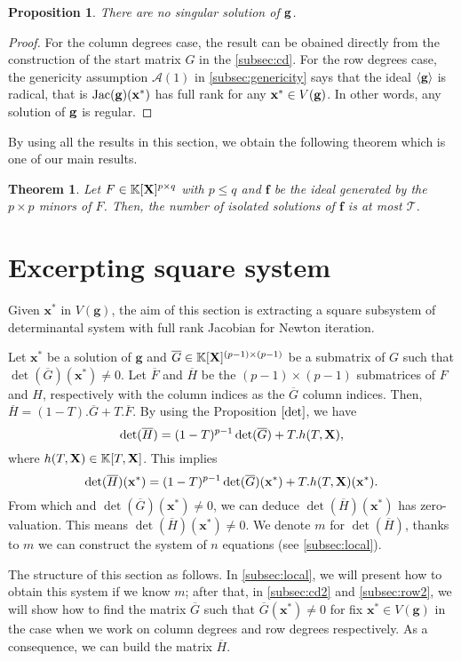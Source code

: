 \documentclass[11pt]{article}
\numberwithin{Property}{section}
\newtheorem{Theorem}{Theorem}%
\numberwithin{Theorem}{section}
\newtheorem{Proposition}{Proposition}%
\numberwithin{Proposition}{section}
\numberwithin{Lemma}{section}
\numberwithin{Corollary}{section}
\numberwithin{Definition}{section}
\numberwithin{Remark}{section}
\numberwithin{Conjecture}{section}
\numberwithin{Problem}{section}
\numberwithin{Claim}{section}
\theoremstyle{definition}
\numberwithin{Example}{section}
\def\f {\ensuremath{\mathbf{f}}}
\def\g {\ensuremath{\mathbf{g}}}
\renewcommand{\leq}{\leqslant}
\def\bar{\overline}
\newcommand{\field}{\mathbb{K}} %
\newcommand{\mat}[1]{\mathbf{\MakeUppercase{#1}}} %
\newcommand{\improve}[1]{\textcolor{blue}{#1}} %
\begin{document}
\begin{Proposition}
There are no singular solution of ${\bf g}$.
\end{Proposition}
\begin{proof}
For the column degrees case, the result can be obained directly from the construction of the start matrix $G$ in the \improve{\cref{subsec:cd}}. For the row degrees case, the genericity assumption $\mathcal{A}(1)$ in \improve{\cref{subsec:genericity}} says that the ideal $\langle {\bf g} \rangle$ is radical, that is $\mathrm{Jac}({\bf g})(\mathbf{x}^*)$ has full rank for any $\mathbf{x}^* \in V({\bf g})$. In other words, any solution of ${\bf g}$ is regular.  
\end{proof}
By using all the results in this section, we obtain the following theorem which is one of our main results.
\begin{Theorem}
Let $F \in \field[\mat{X}]^{p \times q}$ with $p \leq q$ and $\f$ be the ideal generated by the $p \times p$ minors of $F$. Then, the number of isolated solutions of $\f$ is at most $\mathcal{T}$. 
\end{Theorem}
\section{Excerpting square system}
\label{sec:extractsubsystem}
Given $\mathbf{x}^*$ in $V(\g)$, the aim of this section is extracting a square subsystem of determinantal system with full rank Jacobian for Newton iteration. 

Let $\mathbf{x}^*$ be a solution of $\g$ and $\bar{G} \in \field[\mat{X}]^{(p-1) \times (p-1)}$ be a submatrix of $G$ such that $\det(\bar{G})(\mathbf{x}^*) \ne 0$. Let $\bar{F}$ and $\bar{H}$ be the $(p-1) \times (p-1)$ submatrices of $F$ and $H$, respectively with the column indices as the $\bar{G}$ column indices. Then, $\bar{H} = (1-T).\bar{G} + T.\bar{F}$. By using the Proposition $\ref{det}$, we have 
\[
\det(\bar{H}) = (1-T)^{p-1} \det(\bar{G}) + T.h(T,\mat{X}),
\] where $h(T,\mat{X}) \in \field[T,\mat{X}]$. This implies 
\[
\det(\bar{H})(\mathbf{x}^*) = (1-T)^{p-1} \det(\bar{G})(\mathbf{x}^*) + T.h(T,\mat{X})(\mathbf{x}^*). 
\] From which and $\det(\bar{G})(\mathbf{x}^*) \ne 0$, we can deduce $\det(\bar{H})(\mathbf{x}^*)$ has zero-valuation. This means $\det(\bar{H})(\mathbf{x}^*) \ne 0$. We denote $m$ for $\det(\bar{H})$, thanks to $m$ we can construct the system of $n$ equations (see \improve{\cref{subsec:local}}). 

The structure of this section as follows. In \improve{\cref{subsec:local}}, we will present how to obtain this system if we know $m$; after that, in \improve{\cref{subsec:cd2}} and \improve{\cref{subsec:row2}}, we will show how to find the matrix $\bar{G}$ such that $\bar{G}(\mathbf{x}^*) \ne 0$ for fix $\mathbf{x}^* \in V(\g)$ in the case when we work on column degrees and row degrees respectively. As a consequence, we can build the matrix $\bar{H}$. 
\end{document}
